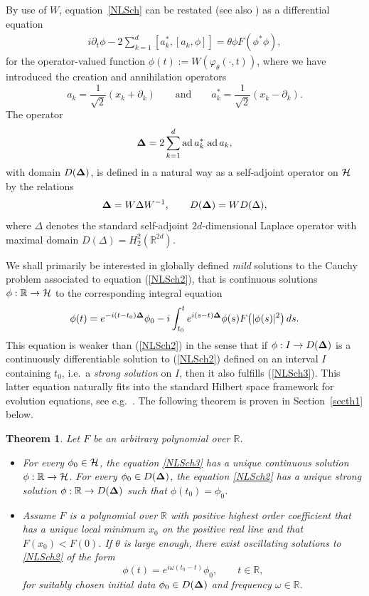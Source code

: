\documentclass[10pt,a4paper]{amsart}
\newtheorem{theorem}{Theorem}
\begin{document}
By use of $W$, equation~\eqref{NLSch} can be restated (see also \cite{DJN})
as a dif\/ferential equation
\begin{gather}
\label{NLSch2}
i\partial_t\phi - 2 \sum_{k=1}^d[a_k^*,[a_k,\phi]] =\theta \phi F(\phi^*\phi) ,
\end{gather}
 for  the operator-valued function $\phi(t) := W(\varphi_\theta(\cdot,t))$,
where we have introduced the creation and annihilation operators
\[
a_k =\frac{1}{\sqrt 2}(x_k + \partial_k)\qquad\mbox{and}\qquad a_k^* =
\frac{1}{\sqrt 2}(x_k - \partial_k) .
\]
The operator
\[
{\bf \Delta} = 2 \sum_{k=1}^d \mbox{ad}\, a_k^*\;\mbox{ad}\, a_k,
\]
with domain $D({\bf\Delta})$,
is def\/ined in a natural way as a self-adjoint operator on $\cal H$ by the
relations
\begin{gather}
\label{tria}
{\bf \Delta} =  W\Delta W^{-1} ,\qquad D({\bf \Delta})=WD(\Delta) ,
\end{gather}
where $\Delta$ denotes the standard self-adjoint $2d$-dimensional Laplace
operator with maximal domain $D(\Delta)=H_2^2(\mathbb R^{2d})$.

We shall primarily be interested in globally def\/ined \emph{mild}
solutions to the Cauchy problem associated to
equation (\ref{NLSch2}), that is continuous solutions $\phi:\mathbb
R\to{\cal H}$ to the corresponding integral equation
\begin{gather}
\label{NLSch3}
\phi(t) = e^{-i(t-t_0){\bf \Delta}}\phi_0 - i\int_{t_0}^t e^{i(s-t){\bf \Delta}}
\phi(s) F\big(|\phi(s)|^2\big)\,ds .
\end{gather}
This equation is weaker than (\ref{NLSch2}) in the sense that if
$\phi: I\to D({\bf \Delta})$ is a continuously dif\/ferentiable solution to
(\ref{NLSch2}) def\/ined on an interval $I$ containing $t_0$, i.e.\ a
\emph{strong solution} on $I$, then it also fulf\/ills (\ref{NLSch3}).
This latter equation  naturally f\/its into
the standard Hilbert space framework for evolution equations, see
e.g.~\cite{RS,Reed}. The following theorem is proven in Section~\ref{secth1}
below.

\begin{theorem}\label{th1} Let $F$ be an arbitrary polynomial over
  $\mathbb R$.
\begin{itemize}\itemsep=0pt
\item[$a)$]  For every $\phi_0\in{\cal H}$, the
equation \eqref{NLSch3} has a unique continuous
solution $\phi:\mathbb R\to {\cal H}$.  For every $\phi_0\in D({\bf\Delta})$, the
equation \eqref{NLSch2} has a unique strong
solution $\phi:\mathbb R\to D({\bf\Delta})$ such that $\phi(t_0)=\phi_0$.
\item[$b)$]  Assume $F$ is a polynomial over $\mathbb R$ with positive
highest order coefficient that has a unique local minimum $x_0$ on the
positive  real line and that $F(x_0)< F(0)$.
If $\theta$ is large enough, there exist oscillating solutions to
\eqref{NLSch2} of the form
\[
\phi(t) = e^{i\omega(t_0-t)}\phi_0 ,\qquad t\in\mathbb R ,
\]
for suitably chosen initial data $\phi_0\in D({\bf\Delta})$ and frequency
$\omega\in\mathbb R$.
\end{itemize}
\end{theorem}
\end{document}
